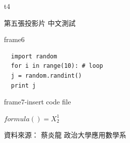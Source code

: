 \documentclass[xcolor=dvipsnames, utf8]{beamer}
\begin{document}
\begin{CJK}{UTF8}{bsmi}
\begin{frame}[fragile]{t4}
\hyperlink{t3}{}
\end{frame}

\begin{frame}{第五張投影片}
中文測試 %




\end{frame}

\begin{frame}[fragile]{frame6}
\lstset{language=python,
        numbers=left,
        numberstyle=\tiny,
        showstringspaces=false,
        frame=leftline
}

\begin{lstlisting}
  import random
  for i in range(10): # loop
  j = random.randint()
  print j
\end{lstlisting}

\end{frame}

\begin{frame}{frame7-insert code file}
  
\end{frame}

\begin{frame}

$formula() = X^1_2$


資料來源：
蔡炎龍
政治大學應用數學系
\end{frame}

\end{CJK}
\end{document}
